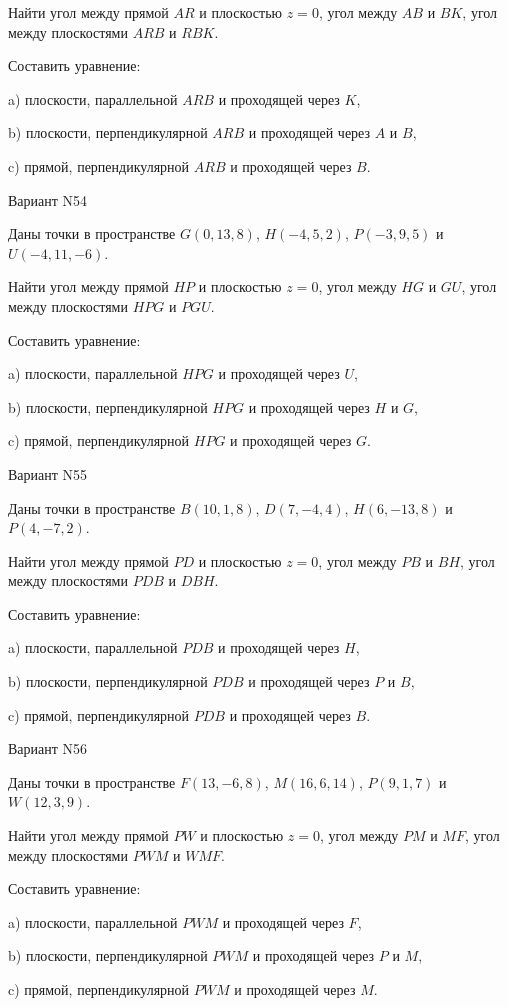 \documentclass[11pt]{report}
\begin{document}
Найти угол между прямой $AR$ и плоскостью $z = 0$, угол между $AB$ и $BK$, угол между плоскостями $ARB$ 
и $RBK$.

Составить уравнение: 

a) плоскости, параллельной $ARB$ и проходящей через $K$,

b) плоскости, перпендикулярной $ARB$ и проходящей через $A$ и $B$,

c) прямой, перпендикулярной $ARB$ и проходящей через $B$.

Вариант N54

Даны точки в пространстве
$G(0, 13, 8)$, $H(-4, 5, 2)$, $P(-3, 9, 5)$ и
$U(-4, 11, -6)$.

Найти угол между прямой $HP$ и плоскостью $z = 0$, угол между $HG$ и $GU$, угол между плоскостями $HPG$ 
и $PGU$.

Составить уравнение: 

a) плоскости, параллельной $HPG$ и проходящей через $U$,

b) плоскости, перпендикулярной $HPG$ и проходящей через $H$ и $G$,

c) прямой, перпендикулярной $HPG$ и проходящей через $G$.

Вариант N55

Даны точки в пространстве
$B(10, 1, 8)$, $D(7, -4, 4)$, $H(6, -13, 8)$ и
$P(4, -7, 2)$.

Найти угол между прямой $PD$ и плоскостью $z = 0$, угол между $PB$ и $BH$, угол между плоскостями $PDB$ 
и $DBH$.

Составить уравнение: 

a) плоскости, параллельной $PDB$ и проходящей через $H$,

b) плоскости, перпендикулярной $PDB$ и проходящей через $P$ и $B$,

c) прямой, перпендикулярной $PDB$ и проходящей через $B$.

Вариант N56

Даны точки в пространстве
$F(13, -6, 8)$, $M(16, 6, 14)$, $P(9, 1, 7)$ и
$W(12, 3, 9)$.

Найти угол между прямой $PW$ и плоскостью $z = 0$, угол между $PM$ и $MF$, угол между плоскостями $PWM$ 
и $WMF$.

Составить уравнение: 

a) плоскости, параллельной $PWM$ и проходящей через $F$,

b) плоскости, перпендикулярной $PWM$ и проходящей через $P$ и $M$,

c) прямой, перпендикулярной $PWM$ и проходящей через $M$.
\end{document}
